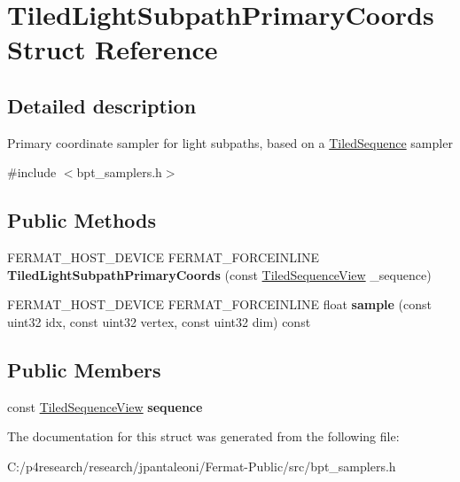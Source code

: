 \hypertarget{struct_tiled_light_subpath_primary_coords}{}\section{Tiled\+Light\+Subpath\+Primary\+Coords Struct Reference}
\label{struct_tiled_light_subpath_primary_coords}


\subsection{Detailed description}
Primary coordinate sampler for light subpaths, based on a \hyperlink{struct_tiled_sequence}{Tiled\+Sequence} sampler 

{\ttfamily \#include $<$bpt\+\_\+samplers.\+h$>$}

\subsection*{Public Methods}
\begin{DoxyCompactItemize}
\item 
\mbox{\label{struct_tiled_light_subpath_primary_coords_aee258ca0c592de5b62d9f6260af19919}} 
F\+E\+R\+M\+A\+T\+\_\+\+H\+O\+S\+T\+\_\+\+D\+E\+V\+I\+CE F\+E\+R\+M\+A\+T\+\_\+\+F\+O\+R\+C\+E\+I\+N\+L\+I\+NE {\bfseries Tiled\+Light\+Subpath\+Primary\+Coords} (const \hyperlink{struct_tiled_sequence_view}{Tiled\+Sequence\+View} \+\_\+sequence)
\item 
\mbox{\label{struct_tiled_light_subpath_primary_coords_a4247c028fb39e844b4b22fcc5b4ffbf6}} 
F\+E\+R\+M\+A\+T\+\_\+\+H\+O\+S\+T\+\_\+\+D\+E\+V\+I\+CE F\+E\+R\+M\+A\+T\+\_\+\+F\+O\+R\+C\+E\+I\+N\+L\+I\+NE float {\bfseries sample} (const uint32 idx, const uint32 vertex, const uint32 dim) const
\end{DoxyCompactItemize}
\subsection*{Public Members}
\begin{DoxyCompactItemize}
\item 
\mbox{\label{struct_tiled_light_subpath_primary_coords_ae3990d7eabcf82fbade5ccac6bfbb560}} 
const \hyperlink{struct_tiled_sequence_view}{Tiled\+Sequence\+View} {\bfseries sequence}
\end{DoxyCompactItemize}


The documentation for this struct was generated from the following file\+:\begin{DoxyCompactItemize}
\item 
C\+:/p4research/research/jpantaleoni/\+Fermat-\/\+Public/src/bpt\+\_\+samplers.\+h\end{DoxyCompactItemize}
